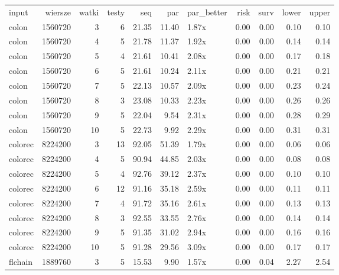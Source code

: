 \begin{table}[ht]
\centering
\begin{tabular}{lrrrrrlrrrr}
 input & wiersze & watki & testy & seq & par & par\_better & risk & surv & lower & upper \\ 
 colon & 1560720 &   3 &   6 & 21.35 & 11.40 & 1.87x & 0.00 & 0.00 & 0.10 & 0.10 \\ 
   \hline
colon & 1560720 &   4 &   5 & 21.78 & 11.37 & 1.92x & 0.00 & 0.00 & 0.14 & 0.14 \\ 
   \hline
colon & 1560720 &   5 &   4 & 21.61 & 10.41 & 2.08x & 0.00 & 0.00 & 0.17 & 0.18 \\ 
   \hline
colon & 1560720 &   6 &   5 & 21.61 & 10.24 & 2.11x & 0.00 & 0.00 & 0.21 & 0.21 \\ 
   \hline
colon & 1560720 &   7 &   5 & 22.13 & 10.57 & 2.09x & 0.00 & 0.00 & 0.23 & 0.24 \\ 
   \hline
colon & 1560720 &   8 &   3 & 23.08 & 10.33 & 2.23x & 0.00 & 0.00 & 0.26 & 0.26 \\ 
   \hline
colon & 1560720 &   9 &   5 & 22.04 & 9.54 & 2.31x & 0.00 & 0.00 & 0.28 & 0.29 \\ 
   \hline
colon & 1560720 &  10 &   5 & 22.73 & 9.92 & 2.29x & 0.00 & 0.00 & 0.31 & 0.31 \\ 
   \hline
colorec & 8224200 &   3 &  13 & 92.05 & 51.39 & 1.79x & 0.00 & 0.00 & 0.06 & 0.06 \\ 
   \hline
colorec & 8224200 &   4 &   5 & 90.94 & 44.85 & 2.03x & 0.00 & 0.00 & 0.08 & 0.08 \\ 
   \hline
colorec & 8224200 &   5 &   4 & 92.76 & 39.12 & 2.37x & 0.00 & 0.00 & 0.10 & 0.10 \\ 
   \hline
colorec & 8224200 &   6 &  12 & 91.16 & 35.18 & 2.59x & 0.00 & 0.00 & 0.11 & 0.11 \\ 
   \hline
colorec & 8224200 &   7 &   4 & 91.72 & 35.16 & 2.61x & 0.00 & 0.00 & 0.13 & 0.13 \\ 
   \hline
colorec & 8224200 &   8 &   3 & 92.55 & 33.55 & 2.76x & 0.00 & 0.00 & 0.14 & 0.14 \\ 
   \hline
colorec & 8224200 &   9 &   5 & 91.35 & 31.02 & 2.94x & 0.00 & 0.00 & 0.16 & 0.16 \\ 
   \hline
colorec & 8224200 &  10 &   5 & 91.28 & 29.56 & 3.09x & 0.00 & 0.00 & 0.17 & 0.17 \\ 
   \hline
flchain & 1889760 &   3 &   5 & 15.53 & 9.90 & 1.57x & 0.00 & 0.04 & 2.27 & 2.54 \\ 

\end{tabular}
\end{table}
